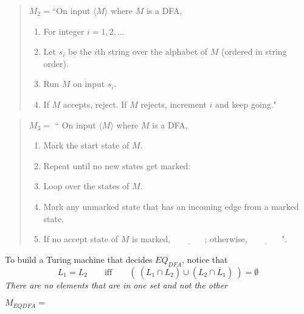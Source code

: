 \documentclass[12pt, oneside]{article}
\begin{document}
      \begin{multicols}{2}
      \begin{quote}
      $M_2 =  $``On  input  $\langle M\rangle$ where $M$ is a  DFA,
      \begin{enumerate}
      \item For integer  $i = 1, 2, \ldots$
      \item \qquad Let  $s_i$ be the  $i$th string over  the alphabet of  $M$ (ordered in  string order).
      \item \qquad Run $M$ on  input  $s_i$.
      \item \qquad If $M$  accepts,  reject.  If $M$  rejects, increment $i$ and keep going."
      \end{enumerate}
      \end{quote}
      
      \vfill

      \columnbreak
    
    
      \begin{quote}
      $M_3 =  $ `` On  input $\langle M \rangle$ where $M$ is  a  DFA,
      \begin{enumerate}
      \item Mark the start  state  of $M$.
      \item Repeat until no  new states get marked:
      \item \qquad Loop over the states of $M$. 
      \item \qquad Mark any unmarked  state  that  has an incoming  edge  from a marked state.
      \item If  no  accept state of $M$ is  marked, $\underline{\phantom{FILL  IN}}$;  otherwise, 
      $\underline{\phantom{FILL  IN}}$".
      \end{enumerate}
      \end{quote}
    \end{multicols}
      
    \vfill
    
    \newpage

    To build a Turing machine that decides $EQ_{DFA}$, notice that 
    \[
    L_1 = L_2 \qquad\textrm{iff}\qquad (~(L_1 \cap \overline{L_2}) \cup (L_2 \cap \overline L_1)~) = \emptyset  
    \]
    {\it There are no elements that are in one set and not the other}
    
    
    $M_{EQDFA} = $ 
    
    
      \vfill
      
\end{document}
